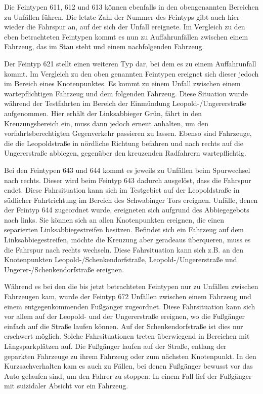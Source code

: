 Die Feintypen 611, 612 und 613 können ebenfalls in den obengenannten Bereichen zu Unfällen führen. Die letzte Zahl der Nummer des Feintyps gibt auch hier wieder die Fahrspur an, auf der sich der Unfall ereignete. Im Vergleich zu den eben betrachteten Feintypen kommt es nun zu Auffahrunfällen zwischen einem Fahrzeug, das im Stau steht und einem nachfolgenden Fahrzeug.   

Der Feintyp 621 stellt einen weiteren Typ dar, bei dem es zu einem Auffahrunfall kommt. Im Vergleich zu den oben genannten Feintypen ereignet sich dieser jedoch im Bereich eines Knotenpunktes. Es kommt zu einem Unfall zwischen einem wartepflichtigen Fahrzeug und dem folgenden Fahrzeug. Diese Situation wurde während der Testfahrten im Bereich der Einmündung Leopold-/Ungererstraße aufgenommen. Hier erhält der Linksabbieger Grün, fährt in den Kreuzungsbereich ein, muss dann jedoch erneut anhalten, um den vorfahrtsberechtigten Gegenverkehr passieren zu lassen. Ebenso sind Fahrzeuge, die die Leopoldstraße in nördliche Richtung befahren und nach rechts auf die Ungererstraße abbiegen, gegenüber den kreuzenden Radfahrern wartepflichtig.

Bei den Feintypen 643 und 644 kommt es jeweils zu Unfällen beim Spurwechsel nach rechts. Dieser wird beim Feintyp 643 dadurch ausgelöst, dass die Fahrspur endet. Diese Fahrsituation kann sich im Testgebiet auf der Leopoldstraße in südlicher Fahrtrichtung im Bereich des Schwabinger Tors ereignen. Unfälle, denen der Feintyp 644 zugeordnet wurde, ereigneten sich aufgrund des Abbiegegebots nach links. Sie können sich an allen Knotenpunkten ereignen, die einen separierten Linksabbiegestreifen besitzen. Befindet sich ein Fahrzeug auf dem Linksabbiegestreifen, möchte die Kreuzung aber geradeaus überqueren, muss es die Fahrspur nach rechts wechseln. Diese Fahrsituation kann sich z.B. an den Knotenpunkten Leopold-/Schenkendorfstraße, Leopold-/Ungererstraße und Ungerer-/Schenkendorfstraße ereignen.

Während es bei den die bis jetzt betrachteten Feintypen nur zu Unfällen zwischen Fahrzeugen kam, wurde der Feintyp 672 Unfällen zwischen einem Fahrzeug und einem entgegenkommenden Fußgänger zugeordnet. Diese Fahrsituation kann sich vor allem auf der Leopold- und der Ungererstraße ereignen, wo die Fußgänger einfach auf die Straße laufen können. Auf der Schenkendorfstraße ist dies nur erschwert möglich. Solche Fahrsituationen treten überwiegend in Bereichen mit Längsparkplätzen auf. Die Fußgänger laufen auf der Straße, entlang der geparkten Fahrzeuge zu ihrem Fahrzeug oder zum nächsten Knotenpunkt. In den Kurzsachverhalten kam es auch zu Fällen, bei denen Fußgänger bewusst vor das Auto gelaufen sind, um den Fahrer zu stoppen. In einem Fall lief der Fußgänger mit suizidaler Absicht vor ein Fahrzeug.


